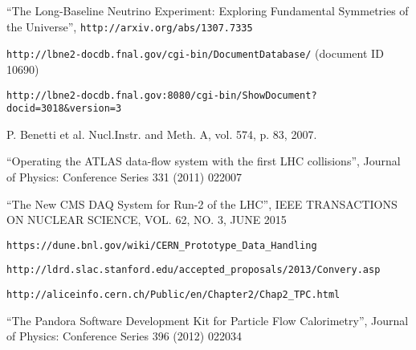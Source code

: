 \begin{thebibliography}{99}

 ``The Long-Baseline Neutrino Experiment: Exploring Fundamental Symmetries of the Universe'',  \verb!http://arxiv.org/abs/1307.7335!

 \verb!http://lbne2-docdb.fnal.gov/cgi-bin/DocumentDatabase/! (document ID 10690)

 \verb!http://lbne2-docdb.fnal.gov:8080/cgi-bin/ShowDocument?docid=3018&version=3!

 P. Benetti et al. Nucl.Instr. and Meth. A, vol. 574, p. 83, 2007.

 ``Operating the ATLAS data-flow system with the first LHC collisions'', Journal of Physics: Conference Series 331 (2011) 022007

 ``The New CMS DAQ System for Run-2 of the LHC'', IEEE TRANSACTIONS ON NUCLEAR SCIENCE, VOL. 62, NO. 3, JUNE 2015

 \verb!https://dune.bnl.gov/wiki/CERN_Prototype_Data_Handling!

 \verb!http://ldrd.slac.stanford.edu/accepted_proposals/2013/Convery.asp!

 \verb!http://aliceinfo.cern.ch/Public/en/Chapter2/Chap2_TPC.html!

 ``The Pandora Software Development Kit for Particle Flow Calorimetry'', Journal of Physics: Conference Series 396 (2012) 022034

\end{thebibliography}